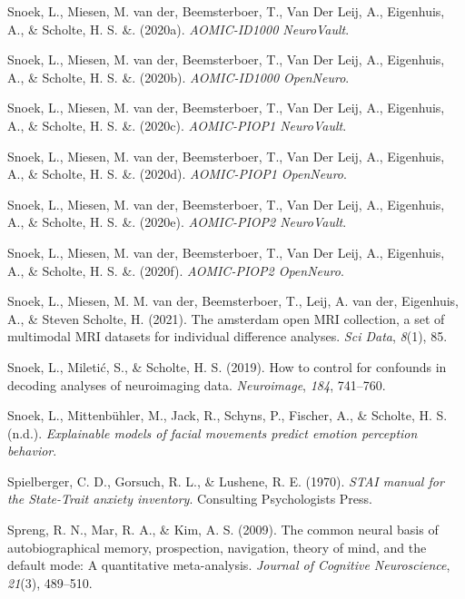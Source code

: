 \documentclass[11pt,american,a4paper,oneside,]{memoir} %
\begin{document}
\leavevmode\hypertarget{ref-Snoek2020n-id1000}{}%
Snoek, L., Miesen, M. van der, Beemsterboer, T., Van Der Leij, A., Eigenhuis, A., \& Scholte, H. S. \&. (2020a). \emph{AOMIC-ID1000 NeuroVault}.

\leavevmode\hypertarget{ref-Snoek2020-id1000}{}%
Snoek, L., Miesen, M. van der, Beemsterboer, T., Van Der Leij, A., Eigenhuis, A., \& Scholte, H. S. \&. (2020b). \emph{AOMIC-ID1000 OpenNeuro}.

\leavevmode\hypertarget{ref-Snoek2020n-piop1}{}%
Snoek, L., Miesen, M. van der, Beemsterboer, T., Van Der Leij, A., Eigenhuis, A., \& Scholte, H. S. \&. (2020c). \emph{AOMIC-PIOP1 NeuroVault}.

\leavevmode\hypertarget{ref-Snoek2020-piop1}{}%
Snoek, L., Miesen, M. van der, Beemsterboer, T., Van Der Leij, A., Eigenhuis, A., \& Scholte, H. S. \&. (2020d). \emph{AOMIC-PIOP1 OpenNeuro}.

\leavevmode\hypertarget{ref-Snoek2020n-piop2}{}%
Snoek, L., Miesen, M. van der, Beemsterboer, T., Van Der Leij, A., Eigenhuis, A., \& Scholte, H. S. \&. (2020e). \emph{AOMIC-PIOP2 NeuroVault}.

\leavevmode\hypertarget{ref-Snoek2020-piop2}{}%
Snoek, L., Miesen, M. van der, Beemsterboer, T., Van Der Leij, A., Eigenhuis, A., \& Scholte, H. S. \&. (2020f). \emph{AOMIC-PIOP2 OpenNeuro}.

\leavevmode\hypertarget{ref-Snoek2021-jx}{}%
Snoek, L., Miesen, M. M. van der, Beemsterboer, T., Leij, A. van der, Eigenhuis, A., \& Steven Scholte, H. (2021). The amsterdam open MRI collection, a set of multimodal MRI datasets for individual difference analyses. \emph{Sci Data}, \emph{8}(1), 85.

\leavevmode\hypertarget{ref-Snoek2019-my}{}%
Snoek, L., Miletić, S., \& Scholte, H. S. (2019). How to control for confounds in decoding analyses of neuroimaging data. \emph{Neuroimage}, \emph{184}, 741--760.

\leavevmode\hypertarget{ref-snoek-submitted}{}%
Snoek, L., Mittenbühler, M., Jack, R., Schyns, P., Fischer, A., \& Scholte, H. S. (n.d.). \emph{Explainable models of facial movements predict emotion perception behavior}.

\leavevmode\hypertarget{ref-Spielberger1970-td}{}%
Spielberger, C. D., Gorsuch, R. L., \& Lushene, R. E. (1970). \emph{STAI manual for the State-Trait anxiety inventory}. Consulting Psychologists Press.

\leavevmode\hypertarget{ref-spreng2009common}{}%
Spreng, R. N., Mar, R. A., \& Kim, A. S. (2009). The common neural basis of autobiographical memory, prospection, navigation, theory of mind, and the default mode: A quantitative meta-analysis. \emph{Journal of Cognitive Neuroscience}, \emph{21}(3), 489--510.
\end{document}
